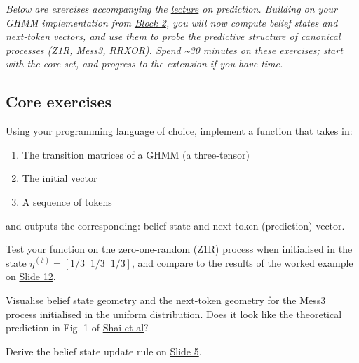 \emph{Below are exercises accompanying the \href{https://drive.google.com/file/d/1IPz8Pq939VbjmVqYcYDybdJ02yvdgMGS/view?usp=sharing}{lecture} on prediction. Building on your GHMM implementation from \hyperref[hidden-markov-models]{Block 2}, you will now compute belief states and next-token vectors, and use them to probe the predictive structure of canonical processes (Z1R, Mess3, RRXOR). Spend \textasciitilde30 minutes on these exercises; start with the core set, and progress to the extension if you have time.}

\subsection{Core exercises}\label{sec:pred-core}

\begin{exercise}
\label{ex:pred-core-1}
Using your programming language of choice, implement a function that takes in:

\begin{enumerate}
\item
  The transition matrices of a GHMM (a three-tensor)
\item
  The initial vector
\item
  A sequence of tokens
\end{enumerate}

and outputs the corresponding: belief state and next-token (prediction) vector.
\end{exercise}

\begin{exercise}
\label{ex:pred-core-2}
Test your function on the zero-one-random (Z1R) process when initialised in the state \(\eta^{(\emptyset)} = [1/3\;\;1/3\;\;1/3]\), and compare to the results of the worked example on \href{https://drive.google.com/file/d/1IPz8Pq939VbjmVqYcYDybdJ02yvdgMGS/view?usp=sharing}{Slide 12}.
\end{exercise}

\begin{exercise}
\label{ex:pred-core-3}
Visualise belief state geometry and the next-token geometry for the \href{https://github.com/Astera-org/simplexity/blob/main/simplexity/generative_processes/transition_matrices.py}{Mess3 process} initialised in the uniform distribution. Does it look like the theoretical prediction in Fig. 1 of \href{https://arxiv.org/pdf/2405.15943}{Shai et al}?
\end{exercise}

\begin{exercise}
\label{ex:pred-core-4}
Derive the belief state update rule on \href{https://drive.google.com/file/d/1IPz8Pq939VbjmVqYcYDybdJ02yvdgMGS/view?usp=sharing}{Slide 5}.
\end{exercise}

